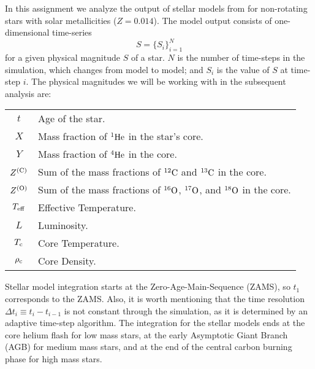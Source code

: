 In this assignment we analyze the output of stellar models from \citep{ekstrom2012grids} for non-rotating stars with solar metallicities ($Z=0.014$).
The model output consists of one-dimensional time-series
\begin{equation}
    S = \{ S_i \}_{i=1}^N
\end{equation}
for a given physical magnitude $S$ of a star. $N$ is the number of time-steps in the simulation, which changes from model to model; and $S_i$ is the value of $S$ at time-step $i$. The physical magnitudes we will be working with in the subsequent analysis are:
\begin{table}[h]
    \centering
    \begin{tabular}{c p{5cm}}
        \( t \)                        & Age of the star.                                                                                         \\
        \( X \)                        & Mass fraction of \( ^1{\rm He} \) in the star's core.                                                    \\
        \( Y \)                        & Mass fraction of \( ^4{\rm He} \) in the core.                                                           \\
        \( Z^{\left({\rm C}\right)} \) & Sum of the mass fractions of \( ^{12}{\rm C} \) and \( ^{13}{\rm C} \) in the core.                      \\
        \( Z^{\left({\rm O}\right)} \) & Sum of the mass fractions of \( ^{16}{\rm O} \), \( ^{17}{\rm O} \), and \( ^{18}{\rm O} \) in the core. \\
        \( T_{\rm eff} \)              & Effective Temperature.                                                                                   \\
        \( L \)                        & Luminosity.                                                                                              \\
        \( T_{\rm c} \)                & Core Temperature.                                                                                        \\
        \( \rho_{\rm c} \)             & Core Density.                                                                                            \\
    \end{tabular}
    \label{tab:parameters}
\end{table}
Stellar model integration starts at the Zero-Age-Main-Sequence (ZAMS), so \( t_1 \) corresponds to the ZAMS. Also, it is worth mentioning that the time resolution
\(\Delta t_i \equiv t_i - t_{i-1} \)
is not constant through the simulation, as it is determined by an adaptive time-step algorithm. The integration for the stellar models ends at the core helium flash for low mass stars, at the early Asymptotic Giant Branch (AGB) for medium mass stars, and at the end of the central carbon burning phase for high mass stars.